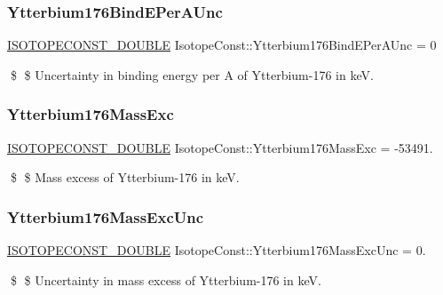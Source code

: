 \subsubsection{\texorpdfstring{Ytterbium176\+Bind\+E\+Per\+A\+Unc}{Ytterbium176BindEPerAUnc}}
{\footnotesize\ttfamily \mbox{\hyperlink{group___isotope_const-_macros_ga8f45a7272ce02c0b4c65c44636ed719a}{I\+S\+O\+T\+O\+P\+E\+C\+O\+N\+S\+T\+\_\+\+D\+O\+U\+B\+LE}} Isotope\+Const\+::\+Ytterbium176\+Bind\+E\+Per\+A\+Unc = 0}

\$ \$ Uncertainty in binding energy per A of Ytterbium-\/176 in keV. \mbox{\label{group___isotope_const-_ytterbium-_yb176_gac75842746c2825c2b6a2e4de1c3eb27a}} 
\subsubsection{\texorpdfstring{Ytterbium176\+Mass\+Exc}{Ytterbium176MassExc}}
{\footnotesize\ttfamily \mbox{\hyperlink{group___isotope_const-_macros_ga8f45a7272ce02c0b4c65c44636ed719a}{I\+S\+O\+T\+O\+P\+E\+C\+O\+N\+S\+T\+\_\+\+D\+O\+U\+B\+LE}} Isotope\+Const\+::\+Ytterbium176\+Mass\+Exc = -\/53491.}

\$ \$ Mass excess of Ytterbium-\/176 in keV. \mbox{\label{group___isotope_const-_ytterbium-_yb176_ga01873f8d0dc12aff00b81ac3b9dbd3d7}} 
\subsubsection{\texorpdfstring{Ytterbium176\+Mass\+Exc\+Unc}{Ytterbium176MassExcUnc}}
{\footnotesize\ttfamily \mbox{\hyperlink{group___isotope_const-_macros_ga8f45a7272ce02c0b4c65c44636ed719a}{I\+S\+O\+T\+O\+P\+E\+C\+O\+N\+S\+T\+\_\+\+D\+O\+U\+B\+LE}} Isotope\+Const\+::\+Ytterbium176\+Mass\+Exc\+Unc = 0.}

\$ \$ Uncertainty in mass excess of Ytterbium-\/176 in keV. \mbox{\label{group___isotope_const-_ytterbium-_yb176_ga8fb6b78d77700b8942dbf99e427ece38}} 
